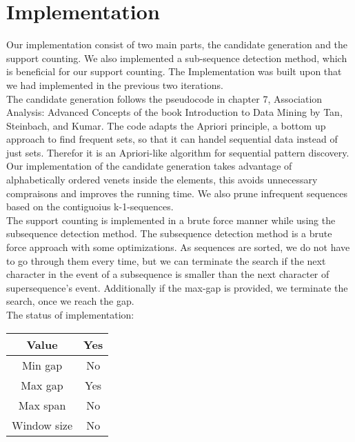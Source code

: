 \section{Implementation}
Our implementation consist of two main parts, the candidate generation and the support counting. We also implemented a sub-sequence detection method, which is beneficial for our support counting. The Implementation was built upon that we had implemented in the previous two iterations. \\

The candidate generation follows the pseudocode in chapter 7, Association Analysis: Advanced Concepts of the book Introduction to Data Mining by Tan, Steinbach, and Kumar. The code adapts the Apriori principle, a bottom up approach to find frequent sets, so that it  can handel sequential data instead of just sets. Therefor it is an Apriori-like algorithm for sequential pattern discovery.\\
Our implementation of the candidate generation takes advantage of alphabetically ordered venets inside the elements, this avoids unnecessary compraisons and  improves the running time. We also prune infrequent sequences based on the contiguoius {k-1}-sequences.\\

The support counting is implemented in a brute force manner while using the subsequence detection method. The subsequence detection method is a brute force approach with some optimizations. As sequences are sorted, we do not have to go through them every time, but we can terminate the search if the next character in the event of a subsequence is smaller than the next character of supersequence’s event. Additionally if the max-gap is provided, we terminate the search, once we reach the gap.\\

The status of implementation:\\
\begin{center}
\begin{tabular}{|c|c|}
\hline Value&Yes\\
\hline Min gap&No\\
\hline Max gap&Yes\\
\hline Max span&No\\
\hline Window size&No\\
\hline
\end{tabular}
\end{center}
